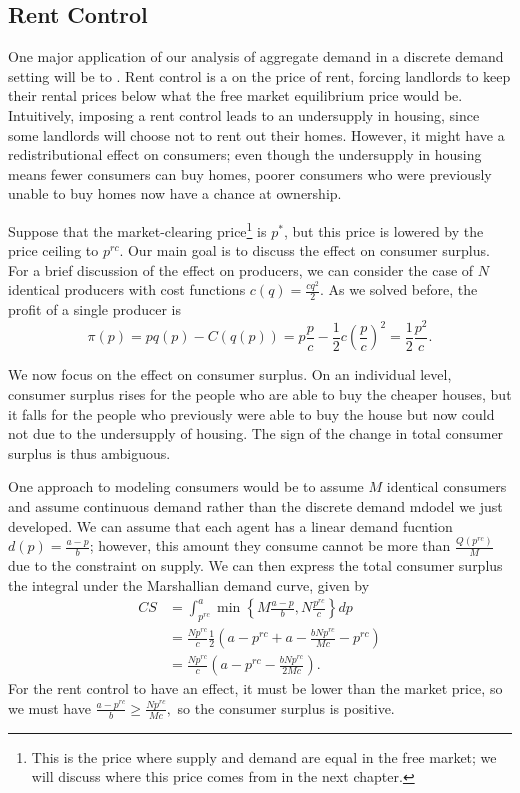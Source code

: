 \subsection*{Rent Control}
One major application of our analysis of aggregate demand in a discrete demand setting will be to . Rent control is a  on the price of rent, forcing landlords to keep their rental prices below what the free market equilibrium price would be. Intuitively, imposing a rent control leads to an undersupply in housing, since some landlords will choose not to rent out their homes. However, it might have a redistributional effect on consumers; even though the undersupply in housing means fewer consumers can buy homes, poorer consumers who were previously unable to buy homes now have a chance at ownership.

Suppose that the market-clearing price\footnote{This is the price where supply and demand are equal in the free market; we will discuss where this price comes from in the next chapter.} is $p^*$, but this price is lowered by the price ceiling to $p^{rc}$. Our main goal is to discuss the effect on consumer surplus. For a brief discussion of the effect on producers, we can consider the case of $N$ identical producers with cost functions $c(q) = \frac{cq^2}{2}.$ As we solved before, the profit of a single producer is 
$$\pi(p)=p q(p)-C(q(p))=p \frac{p}{c}-\frac{1}{2} c\left(\frac{p}{c}\right)^{2}=\frac{1}{2} \frac{p^{2}}{c}.$$

We now focus on the effect on consumer surplus. On an individual level, consumer surplus rises for the people who are able to buy the cheaper houses, but it falls for the people who previously were able to buy the house but now could not due to the undersupply of housing. The sign of the change in total consumer surplus is thus ambiguous. 

One approach to modeling consumers would be to assume $M$ identical consumers and assume continuous demand rather than the discrete demand mdodel we just developed. We can assume that each agent has a linear demand fucntion $d(p) = \frac{a-p}{b}$; however, this amount they consume cannot be more than $\frac{Q(p^{rc})}{M}$ due to the constraint on supply. We can then express the total consumer surplus the integral under the Marshallian demand curve, given by
\begin{align*}
CS &= \int_{p^{r c}}^{a} \min \left\{M \frac{a-p}{b}, N \frac{p^{r c}}{c}\right\} d p \\
&= \frac{N p^{r c}}{c} \frac{1}{2}\left(a-p^{r c}+a-\frac{b N p^{r c}}{M c}-p^{r c}\right) \\
&= \frac{N p^{r c}}{c}\left(a-p^{r c}-\frac{b N p^{r c}}{2 M c}\right).
\end{align*}
For the rent control to have an effect, it must be lower than the market price, so we must have $\frac{a-p^{rc}}{b} \geq \frac{Np^{rc}}{Mc},$ so the consumer surplus is positive.

